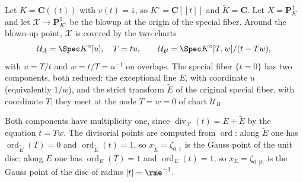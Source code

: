 \begin{example}
\label{ex:berk-reduction-p1-cct}
Let $K=\mathbf C(\!(t)\!)$ with $v(t)=1$, so
$K^\circ=\mathbf C[\![t]\!]$ and $\widetilde K=\mathbf C$.  Let
$X=\mathbf P^1_K$ and let
$\mathcal X\to\mathbf P^1_{K^\circ}$ be the blowup at the origin of the
special fiber.  Around the blown-up point, $\mathcal X$ is covered by
the two charts
\[
 \mathcal U_A=\Spec K^\circ[u],\quad T=tu,
 \qquad
 \mathcal U_B=\Spec K^\circ[T,w]/(t-Tw),
\]
with $u=T/t$ and $w=t/T=u^{-1}$ on overlaps.  The special fiber
$\{t=0\}$ has two components, both reduced: the exceptional line $E$,
with coordinate $u$ (equivalently $1/w$), and the strict transform
$\widetilde E$ of the original special fiber, with coordinate $T$;
they meet at the node $T=w=0$ of chart $\mathcal U_B$.

Both components have multiplicity one, since
$\operatorname{div}_{\mathcal X}(t)=E+\widetilde E$ by the equation
$t=Tw$.  The divisorial points are computed from
$\operatorname{ord}$: along $\widetilde E$ one has
$\operatorname{ord}_{\widetilde E}(T)=0$ and
$\operatorname{ord}_{\widetilde E}(t)=1$, so
$x_{\widetilde E}=\zeta_{0,1}$ is the Gauss point of the unit disc;
along $E$ one has $\operatorname{ord}_E(T)=1$ and
$\operatorname{ord}_E(t)=1$, so $x_E=\zeta_{0,|t|}$ is the Gauss
point of the disc of radius $|t|=\rme^{-1}$.


\end{example}
